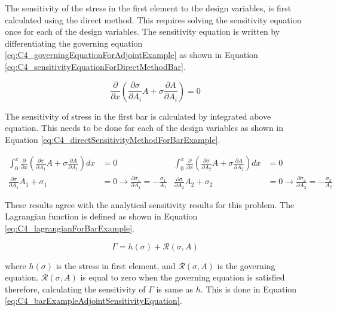 The sensitivity of the stress in the first element to the design variables, is first calculated using the direct method. This requires solving the sensitivity equation once for each of the design variables. The sensitivity equation is written by differentiating the governing equation \eqref{eq:C4_governingEquationForAdjointExample} as shown in Equation \eqref{eq:C4_sensitivityEquationForDirectMethodBar}.

\begin{equation}\label{eq:C4_sensitivityEquationForDirectMethodBar}
	\frac{\partial}{\partial x}
	\left(
	\frac{\partial \sigma}{\partial A_i} A + \sigma \frac{\partial A}{\partial A_i}
	\right) = 0
\end{equation}

The sensitivity of stress in the first bar is calculated by integrated above equation. This needs to be done for each of the design variables as shown in Equation \eqref{eq:C4_directSensitivityMethodForBarExample}.

\begin{subequations}
\begin{align}
	\int_0^x
	\frac{\partial}{\partial x}
	\left(
	\frac{\partial \sigma}{\partial A_1} A + \sigma \frac{\partial A}{\partial A_1}
	\right) dx &= 0 \nonumber \\
	\frac{\partial \sigma}{\partial A_1} A_1 + \sigma_1 &= 0 \rightarrow 
	\frac{\partial \sigma_1}{\partial A_1} = -\frac{\sigma_1}{A_1}
\end{align}
\begin{align}
	\int_0^x
	\frac{\partial}{\partial x}
	\left(
	\frac{\partial \sigma}{\partial A_2} A + \sigma \frac{\partial A}{\partial A_2}
	\right) dx &= 0 \nonumber \\
	\frac{\partial \sigma}{\partial A_2} A_2 + \sigma_2 &= 0 \rightarrow 
	\frac{\partial \sigma_2}{\partial A_2} = -\frac{\sigma_2}{A_2}
\end{align}
\end{subequations}

These results agree with the analytical sensitivity results for this problem. The Lagrangian function is defined as shown in Equation \eqref{eq:C4_lagrangianForBarExample}.

\begin{equation}\label{eq:C4_lagrangianForBarExample}
	\Gamma = h(\sigma) + \mathcal{R}(\sigma, A)
\end{equation}

where $h(\sigma)$ is the stress in first element, and $\mathcal{R}(\sigma, A)$ is the governing equation. $\mathcal{R}(\sigma, A)$ is equal to zero when the governing equation is satisfied therefore, calculating the sensitivity of $\Gamma$ is same as $h$. This is done in Equation \eqref{eq:C4_barExampleAdjointSensitivityEquation}.

